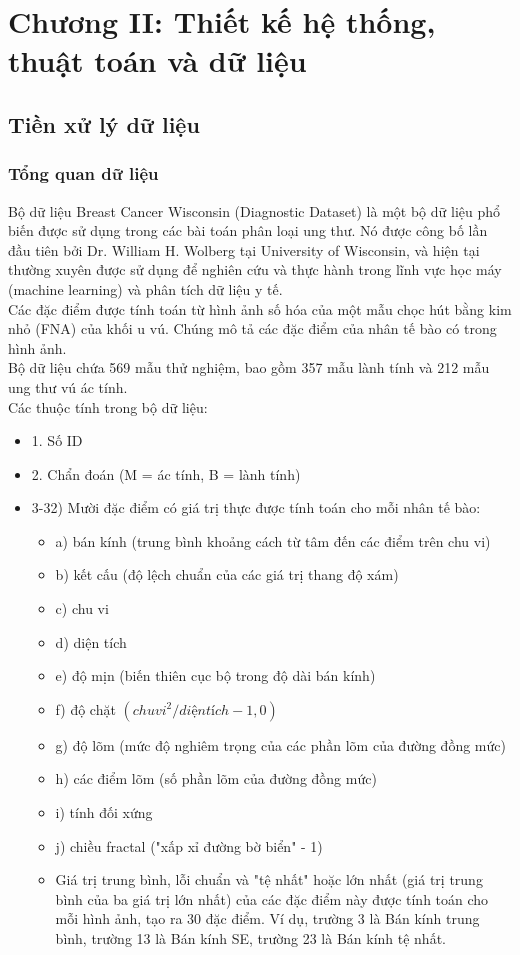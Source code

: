 \section{Chương II: Thiết kế hệ thống, thuật toán và dữ liệu}
\subsection{Tiền xử lý dữ liệu}
\subsubsection{Tổng quan dữ liệu}
Bộ dữ liệu Breast Cancer Wisconsin (Diagnostic Dataset) là một bộ dữ liệu phổ biến được sử dụng trong các bài toán phân loại ung thư. Nó được công bố lần đầu tiên bởi Dr. William H. Wolberg tại University of Wisconsin, và hiện tại thường xuyên được sử dụng để nghiên cứu và thực hành trong lĩnh vực học máy (machine learning) và phân tích dữ liệu y tế.
\\ Các đặc điểm được tính toán từ hình ảnh số hóa của một mẫu chọc hút bằng kim nhỏ (FNA) của khối u vú. Chúng mô tả các đặc điểm của nhân tế bào có trong hình ảnh.
\\ Bộ dữ liệu chứa 569 mẫu thử nghiệm, bao gồm 357 mẫu lành tính và 212 mẫu ung thư vú ác tính. 
\\ Các thuộc tính trong bộ dữ liệu: 
\begin{itemize}
    \item 1. Số ID
    \item 2. Chẩn đoán (M = ác tính, B = lành tính)
    \item 3-32)
    Mười đặc điểm có giá trị thực được tính toán cho mỗi nhân tế bào:
    \begin{itemize}
    \item a) bán kính (trung bình khoảng cách từ tâm đến các điểm trên chu vi)
    \item b) kết cấu (độ lệch chuẩn của các giá trị thang độ xám)
    \item c) chu vi
    \item d) diện tích
    \item e) độ mịn (biến thiên cục bộ trong độ dài bán kính)
    \item f) độ chặt \((chu vi^2 / diện tích - 1,0)\)
    \item g) độ lõm (mức độ nghiêm trọng của các phần lõm của đường đồng mức)
    \item h) các điểm lõm (số phần lõm của đường đồng mức)
    \item i) tính đối xứng
    \item j) chiều fractal ("xấp xỉ đường bờ biển" - 1)
    \item Giá trị trung bình, lỗi chuẩn và "tệ nhất" hoặc lớn nhất (giá trị trung bình của ba giá trị lớn nhất) của các đặc điểm này được tính toán cho mỗi hình ảnh, tạo ra 30 đặc điểm. Ví dụ, trường 3 là Bán kính trung bình, trường 13 là Bán kính SE, trường 23 là Bán kính tệ nhất.
\end{itemize}
\end{itemize}
